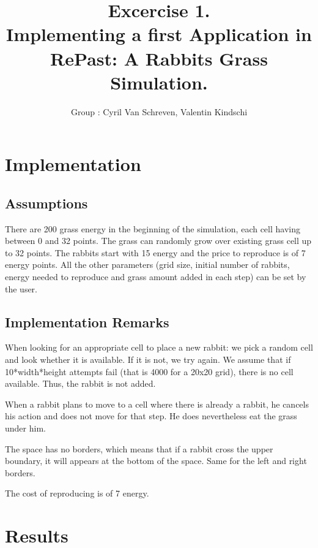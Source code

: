 \documentclass[11pt]{article}
\title{\bf Excercise 1.\\ Implementing a first Application in RePast: A Rabbits Grass Simulation.}
\author{Group \textnumero{44}: Cyril Van Schreven, Valentin Kindschi}
\begin{document}
\maketitle

\section{Implementation}

\subsection{Assumptions}

There are 200 grass energy in the beginning of the simulation, each cell having between 0 and 32 points. The grass can randomly grow over existing grass cell up to 32 points. The rabbits start with 15 energy and the price to reproduce is of 7 energy points. All the other parameters (grid size, initial number of rabbits, energy needed to reproduce and grass amount added in each step) can be set by the user.


\subsection{Implementation Remarks}

When looking for an appropriate cell to place a new rabbit: we pick a random cell and look whether it is available. If it is not, we try again. We assume that if 10*width*height attempts fail (that is 4000 for a 20x20 grid), there is no cell available. Thus, the rabbit is not added.

When a rabbit plans to move to a cell where there is already a rabbit, he cancels his action and does not move for that step. He does nevertheless eat the grass under him.

The space has no borders, which means that if a rabbit cross the upper boundary, it will appears at the bottom of the space. Same for the left and right borders.

The cost of reproducing is of 7 energy.

\section{Results}
\end{document}
